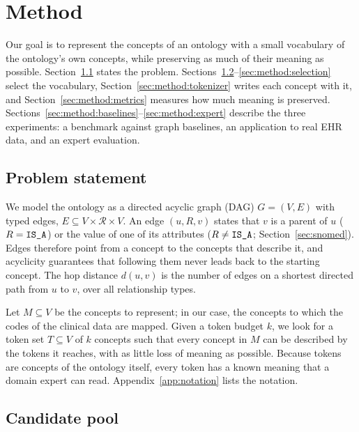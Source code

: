 \section{Method}
\label{sec:method}

Our goal is to represent the concepts of an ontology with a small vocabulary of the ontology's own concepts, while preserving as much of their meaning as possible.
Section~\ref{sec:method:problem} states the problem.
Sections~\ref{sec:method:candidates}--\ref{sec:method:selection} select the vocabulary, Section~\ref{sec:method:tokenizer} writes each concept with it, and Section~\ref{sec:method:metrics} measures how much meaning is preserved.
Sections~\ref{sec:method:baselines}--\ref{sec:method:expert} describe the three experiments: a benchmark against graph baselines, an application to real EHR data, and an expert evaluation.

\subsection{Problem statement}
\label{sec:method:problem}

We model the ontology as a directed acyclic graph (DAG) $G = (V, E)$ with typed edges, $E \subseteq V \times \mathcal{R} \times V$.
An edge $(u, R, v)$ states that $v$ is a parent of $u$ ($R = \texttt{IS\_A}$) or the value of one of its attributes ($R \neq \texttt{IS\_A}$; Section~\ref{sec:snomed}).
Edges therefore point from a concept to the concepts that describe it, and acyclicity guarantees that following them never leads back to the starting concept.
The hop distance $d(u, v)$ is the number of edges on a shortest directed path from $u$ to $v$, over all relationship types.

Let $M \subseteq V$ be the concepts to represent; in our case, the concepts to which the codes of the clinical data are mapped.
Given a token budget $k$, we look for a token set $T \subseteq V$ of $k$ concepts such that every concept in $M$ can be described by the tokens it reaches, with as little loss of meaning as possible.
Because tokens are concepts of the ontology itself, every token has a known meaning that a domain expert can read.
Appendix~\ref{app:notation} lists the notation.

\subsection{Candidate pool}
\label{sec:method:candidates}

